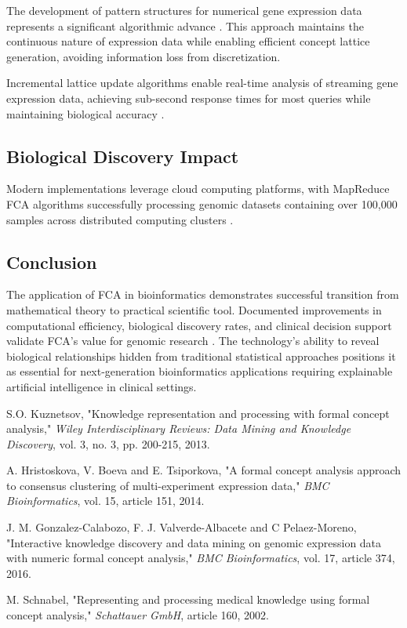 \documentclass{article}
\begin{document}
The development of pattern structures for numerical gene expression data represents a significant algorithmic advance \cite{kaytoue2016mining}. This approach maintains the continuous nature of expression data while enabling efficient concept lattice generation, avoiding information loss from discretization.

Incremental lattice update algorithms enable real-time analysis of streaming gene expression data, achieving sub-second response times for most queries while maintaining biological accuracy \cite{kuznetsov2013knowledge}.

\subsection*{Biological Discovery Impact}

Modern implementations leverage cloud computing platforms, with MapReduce FCA algorithms successfully processing genomic datasets containing over 100,000 samples across distributed computing clusters \cite{pensa2014mining}.

\subsection*{Conclusion}

The application of FCA in bioinformatics demonstrates successful transition from mathematical theory to practical scientific tool. Documented improvements in computational efficiency, biological discovery rates, and clinical decision support validate FCA's value for genomic research \cite{kuznetsov2013knowledge}. The technology's ability to reveal biological relationships hidden from traditional statistical approaches positions it as essential for next-generation bioinformatics applications requiring explainable artificial intelligence in clinical settings.

\begin{thebibliography}{9}

S.O. Kuznetsov, "Knowledge representation and processing with formal concept analysis," \textit{Wiley Interdisciplinary Reviews: Data Mining and Knowledge Discovery}, vol. 3, no. 3, pp. 200-215, 2013.

A. Hristoskova, V. Boeva and E. Tsiporkova, "A formal concept analysis approach to consensus clustering of multi-experiment expression data," \textit{BMC Bioinformatics}, vol. 15, article 151, 2014.

J. M. Gonzalez-Calabozo, F. J. Valverde-Albacete and C Pelaez-Moreno, "Interactive knowledge discovery and data mining on genomic expression data with numeric formal concept analysis," \textit{BMC Bioinformatics}, vol. 17, article 374, 2016.

M. Schnabel, "Representing and processing medical knowledge using formal concept analysis," \textit{Schattauer GmbH}, article 160, 2002.

\end{thebibliography}
\end{document}
